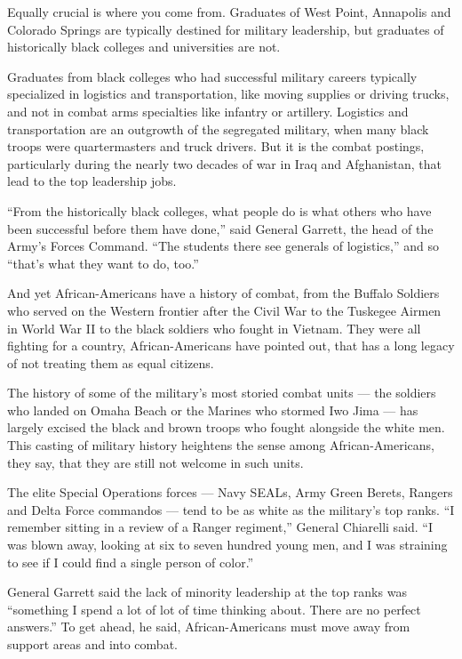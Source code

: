 Equally crucial is where you come from. Graduates of West Point,
Annapolis and Colorado Springs are typically destined for military
leadership, but graduates of historically black colleges and
universities are not.

Graduates from black colleges who had successful military careers
typically specialized in logistics and transportation, like moving
supplies or driving trucks, and not in combat arms specialties like
infantry or artillery. Logistics and transportation are an outgrowth of
the segregated military, when many black troops were quartermasters and
truck drivers. But it is the combat postings, particularly during the
nearly two decades of war in Iraq and Afghanistan, that lead to the top
leadership jobs.

``From the historically black colleges, what people do is what others
who have been successful before them have done,'' said General Garrett,
the head of the Army's Forces Command. ``The students there see generals
of logistics,'' and so ``that's what they want to do, too.''

And yet African-Americans have a history of combat, from the Buffalo
Soldiers who served on the Western frontier after the Civil War to the
Tuskegee Airmen in World War II to the black soldiers who fought in
Vietnam. They were all fighting for a country, African-Americans have
pointed out, that has a long legacy of not treating them as equal
citizens.

The history of some of the military's most storied combat units --- the
soldiers who landed on Omaha Beach or the Marines who stormed Iwo Jima
--- has largely excised the black and brown troops who fought alongside
the white men. This casting of military history heightens the sense
among African-Americans, they say, that they are still not welcome in
such units.

The elite Special Operations forces --- Navy SEALs, Army Green Berets,
Rangers and Delta Force commandos --- tend to be as white as the
military's top ranks. ``I remember sitting in a review of a Ranger
regiment,'' General Chiarelli said. ``I was blown away, looking at six
to seven hundred young men, and I was straining to see if I could find a
single person of color.''

General Garrett said the lack of minority leadership at the top ranks
was ``something I spend a lot of lot of time thinking about. There are
no perfect answers.'' To get ahead, he said, African-Americans must move
away from support areas and into combat.

